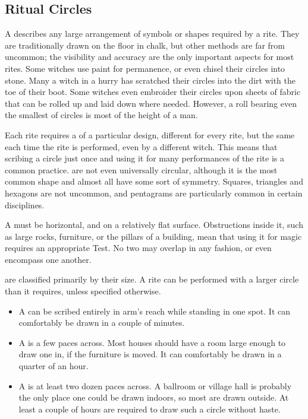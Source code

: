 \subsection{Ritual Circles}

A  describes any large arrangement of symbols or shapes required by a rite.
They are traditionally drawn on the floor in chalk, but other methods are far from uncommon; the visibility and accuracy are the only important aspects for most rites.
Some witches use paint for permanence, or even chisel their circles into stone.
Many a witch in a hurry has scratched their circles into the dirt with the toe of their boot.
Some witches even embroider their circles upon sheets of fabric that can be rolled up and laid down where needed.
However, a roll bearing even the smallest of circles is most of the height of a man.

Each rite requires a  of a particular design, different for every rite, but the same each time the rite is performed, even by a different witch.
This means that scribing a circle just once and using it for many performances of the rite is a common practice.
 are not even universally circular, although it is the most common shape and almost all have some sort of symmetry.
Squares, triangles and hexagons are not uncommon, and pentagrams are particularly common in certain disciplines.

A  must be horizontal, and on a relatively flat surface.
Obstructions inside it, such as large rocks, furniture, or the pillars of a building, mean that using it for magic requires an appropriate Test.
No two  may overlap in any fashion, or even encompass one another.

 are classified primarily by their size.
A rite can be performed with a larger circle than it requires, unless specified otherwise.
\begin{itemize}
	\item A  can be scribed entirely in arm's reach while standing in one spot.
		It can comfortably be drawn in a couple of minutes.
	\item A  is a few paces across.
		Most houses should have a room large enough to draw one in, if the furniture is moved.
		It can comfortably be drawn in a quarter of an hour.
	\item A  is at least two dozen paces across.
		A ballroom or village hall is probably the only place one could be drawn indoors, so most are drawn outside.
		At least a couple of hours are required to draw such a circle without haste.
\end{itemize}

